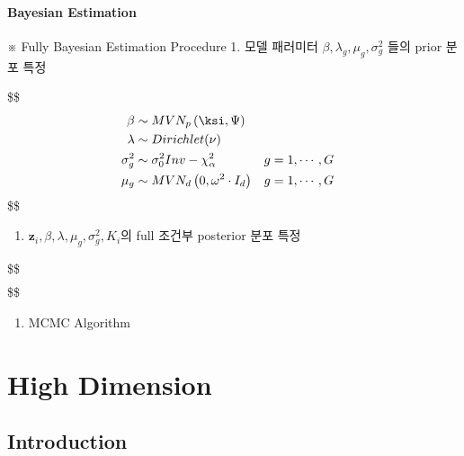 \documentclass[
]{book}
\providecommand{\tightlist}{%
  \setlength{\itemsep}{0pt}\setlength{\parskip}{0pt}}
\begin{document}
{{{\hypertarget{bayesian-estimation}{%
\subsubsection{Bayesian Estimation}\label{bayesian-estimation}}

※ Fully Bayesian Estimation Procedure
1. 모델 패러미터 \(\beta, \lambda_g, \mu_g, \sigma_g^2\) 들의 prior 분포 특정

\$\$
\begin{align}

\beta &\sim MVN_p \left( \ksi , \Psi \right)

\\

\lambda &\sim Dirichlet(\nu)

\\

\sigma^2_g &\sim \sigma_0^2 Inv- \chi_\alpha^2 && g = 1, \cdots, G

\\

\mu_g &\sim MVN_d \left( 0, \omega^2 \cdot I_d \right) && g = 1, \cdots, G


\end{align}
\$\$

\begin{enumerate}
\def\labelenumi{\arabic{enumi}.}
\setcounter{enumi}{1}
\tightlist
\item
  \(\mathbf z_i , \beta, \lambda, \mu_g ,\sigma^2_g, K_i\)의 full 조건부 posterior 분포 특정
\end{enumerate}

\$\$
\begin{alignat}



\end{alignat}
\$\$

\begin{enumerate}
\def\labelenumi{\arabic{enumi}.}
\setcounter{enumi}{2}
\tightlist
\item
  MCMC Algorithm
\end{enumerate}

\hypertarget{high-dimension}{%
\chapter{High Dimension}\label{high-dimension}}

\hypertarget{introduction-3}{%
\section{Introduction}\label{introduction-3}}

}}}
\end{document}
